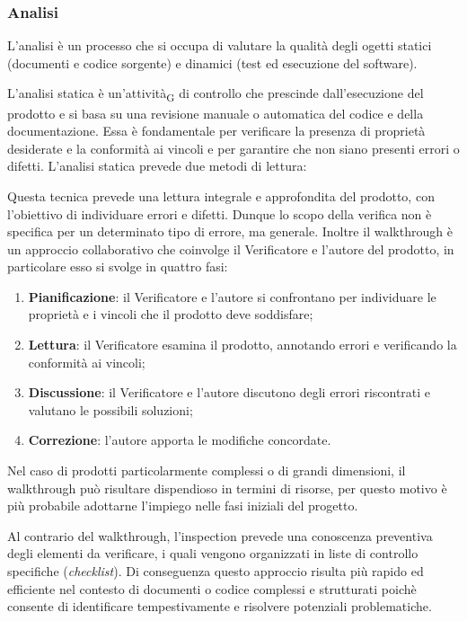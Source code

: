 \subsubsection{Analisi}
L'analisi è un processo che si occupa di valutare la qualità degli ogetti statici (documenti e codice sorgente) e dinamici
(test ed esecuzione del software).

L'analisi statica è un'{attività\textsubscript{G}} di controllo che prescinde dall'esecuzione del prodotto e si basa su una revisione manuale o automatica
del codice e della documentazione. Essa è fondamentale per verificare la presenza di proprietà desiderate e la conformità ai vincoli e
per garantire che non siano presenti errori o difetti. L'analisi statica prevede due metodi di lettura:

Questa tecnica prevede una lettura integrale e approfondita del prodotto, con l'obiettivo di individuare errori e difetti. Dunque lo scopo della verifica
non è specifica per un determinato tipo di errore, ma generale. Inoltre il walkthrough è un approccio collaborativo che coinvolge il Verificatore
e l'autore del prodotto, in particolare esso si svolge in quattro fasi:
\begin{enumerate}
    \item \textbf{Pianificazione}: il Verificatore e l'autore si confrontano per individuare le proprietà e i vincoli che il prodotto deve soddisfare;
    \item \textbf{Lettura}: il Verificatore esamina il prodotto, annotando errori e verificando la conformità ai vincoli;
    \item \textbf{Discussione}: il Verificatore e l'autore discutono degli errori riscontrati e valutano le possibili soluzioni;
    \item \textbf{Correzione}: l'autore apporta le modifiche concordate.
\end{enumerate}
Nel caso di prodotti particolarmente complessi o di grandi dimensioni, il walkthrough può risultare dispendioso in termini di risorse,
per questo motivo è più probabile adottarne l'impiego nelle fasi iniziali del progetto.

Al contrario del walkthrough, l'inspection prevede una conoscenza preventiva degli elementi da verificare, i quali vengono organizzati in
liste di controllo specifiche (\textit{checklist}). Di conseguenza questo approccio risulta più rapido ed efficiente nel contesto di documenti
o codice complessi e strutturati poichè consente di identificare tempestivamente e risolvere potenziali problematiche.

